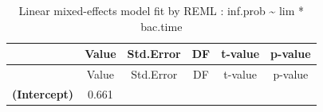 \documentclass[]{article}
\begin{document}
\begin{longtable}[]{@{}cccccc@{}}
\caption{Linear mixed-effects model fit by REML : inf.prob
\textasciitilde{} lim * bac.time}\tabularnewline
\toprule
\begin{minipage}[b]{0.23\columnwidth}\centering\strut
~\strut
\end{minipage} & \begin{minipage}[b]{0.13\columnwidth}\centering\strut
Value\strut
\end{minipage} & \begin{minipage}[b]{0.14\columnwidth}\centering\strut
Std.Error\strut
\end{minipage} & \begin{minipage}[b]{0.06\columnwidth}\centering\strut
DF\strut
\end{minipage} & \begin{minipage}[b]{0.12\columnwidth}\centering\strut
t-value\strut
\end{minipage} & \begin{minipage}[b]{0.12\columnwidth}\centering\strut
p-value\strut
\end{minipage}\tabularnewline
\midrule
\endfirsthead
\toprule
\begin{minipage}[b]{0.23\columnwidth}\centering\strut
~\strut
\end{minipage} & \begin{minipage}[b]{0.13\columnwidth}\centering\strut
Value\strut
\end{minipage} & \begin{minipage}[b]{0.14\columnwidth}\centering\strut
Std.Error\strut
\end{minipage} & \begin{minipage}[b]{0.06\columnwidth}\centering\strut
DF\strut
\end{minipage} & \begin{minipage}[b]{0.12\columnwidth}\centering\strut
t-value\strut
\end{minipage} & \begin{minipage}[b]{0.12\columnwidth}\centering\strut
p-value\strut
\end{minipage}\tabularnewline
\midrule
\endhead
\begin{minipage}[t]{0.23\columnwidth}\centering\strut
\textbf{(Intercept)}\strut
\end{minipage} & \begin{minipage}[t]{0.13\columnwidth}\centering\strut
0.661\strut
\end{minipage} & \begin{minipage}[t]{0.14\columnwidth}\centering\strut

\end{minipage}
\end{longtable}
\end{document}
